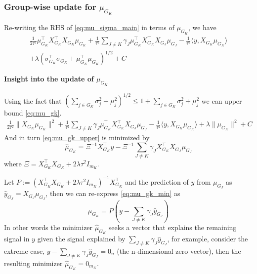 \documentclass[12pt]{article}
\begin{document}
\subsubsection{Group-wise update for $\mu_{G_K}$}

Re-writing the RHS of \eqref{eq:mu_sigma_main} in terms of $\mu_{G_K}$, we have
\begin{equation} \label{eq:mu_gk}
\begin{aligned}
    \frac{1}{2\tau^2} 
    \mu_{G_K}^\top X_{G_K}^\top X_{G_K} \mu_{G_K}
+
    \frac{1}{\tau^2} 
    \sum_{J \neq K} 
	\gamma_J \mu_{G_K}^\top X_{G_K}^\top X_{G_J} \mu_{G_J} 
-
    \frac{1}{\tau^2}
    \langle y, X_{G_K} \mu_{G_K} \rangle \\
+
    \lambda \left( \sigma_{G_K}^\top \sigma_{G_K} + \mu_{G_K}^\top \mu_{G_K} \right)^{1/2} + C
\end{aligned}
\end{equation}

\textbf{Insight into the update of $\mu_{G_K}$}

Using the fact that $ \left( \sum_{j \in G_K} \sigma_j^2 + \mu_j^2 \right)^{1/2} \leq 1 + \sum_{j \in G_K} \sigma_j^2 + \mu_j^2 $ we can upper bound \eqref{eq:mu_gk}.
\begin{equation} \label{eq:mu_gk_upper}
\begin{aligned}
    \frac{1}{2\tau^2} 
    \| X_{G_K} \mu_{G_K} \|^2
+
    \frac{1}{\tau^2} 
    \sum_{J \neq K} 
	\gamma_J \mu_{G_K}^\top X_{G_K}^\top X_{G_J} \mu_{G_J} 
-
    \frac{1}{\tau^2}
    \langle y, X_{G_K} \mu_{G_K} \rangle
+
    \lambda \| \mu_{G_K} \|^2 + C
\end{aligned}
\end{equation}
And in turn \eqref{eq:mu_gk_upper} is minimized by
\begin{equation} \label{eq:mu_gk_min}
    \hat{\mu}_{G_K} = \Xi^{-1} X_{G_K}^\top y - \Xi^{-1} \sum_{J \neq K} \gamma_J X_{G_K}^\top X_{G_J} \mu_{G_J}    
\end{equation}
where $\Xi = X_{G_K}^\top X_{G_K} + 2 \lambda \tau^2 I_{m_K}$. 

Let $P := (X_{G_K}^\top X_{G_K} + 2 \lambda \tau^2 I_{m_K})^{-1} X_{G_K}^\top $ and the prediction of $y$ from $\mu_{G_J}$ as $\hat{y}_{G_J} = X_{G_J} \mu_{G_J}$, then we can re-express \eqref{eq:mu_gk_min} as
\begin{equation}
\hat{\mu}_{G_K} = P(y - \sum_{J \neq K} \gamma_J \hat{y}_{G_J})
\end{equation}
In other words the minimizer $\hat{\mu}_{G_K}$ seeks a vector that explains the remaining signal in $y$ given the signal explained by $\sum_{J \neq K} \gamma_J \hat{y}_{G_J}$, for example, consider the extreme case, $y - \sum_{J \neq K} \gamma_J \hat{y}_{G_J} = 0_n$ (the n-dimensional zero vector), then the resulting minimizer $\hat{\mu}_{G_K} = 0_{m_K}$. 
\end{document}
